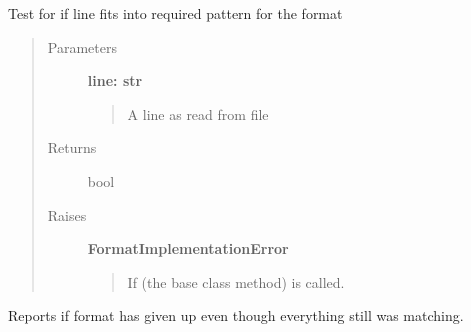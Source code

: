\documentclass[letterpaper,10pt,english]{sphinxmanual}
\begin{document}
\begin{fulllineitems}

\begin{fulllineitems}
\label{fseq.reading:fseq.reading.seq_encoder.SeqFormat.QUALITY_LINE}
\end{fulllineitems}


\begin{fulllineitems}
\label{fseq.reading:fseq.reading.seq_encoder.SeqFormat.SEQUENCE_LINE}
\end{fulllineitems}


\begin{fulllineitems}
\label{fseq.reading:fseq.reading.seq_encoder.SeqFormat.expects}
Test for if line fits into required pattern for the format
\begin{quote}\begin{description}
\item[{Parameters}] \leavevmode
\textbf{line: str}
\begin{quote}

A line as read from file
\end{quote}

\item[{Returns}] \leavevmode
bool

\item[{Raises}] \leavevmode
\textbf{FormatImplementationError}
\begin{quote}

If  (the base class method) is called.
\end{quote}

\end{description}\end{quote}

\end{fulllineitems}


\begin{fulllineitems}
\label{fseq.reading:fseq.reading.seq_encoder.SeqFormat.givenUp}
Reports if format has given up even though everything still was
matching.


\end{fulllineitems}
\end{fulllineitems}
\end{document}
